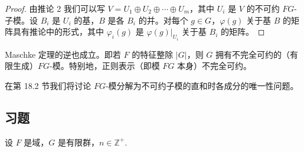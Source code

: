 \begin{proof}
由推论 2 我们可以写 \(V = U_1 \oplus U_2 \oplus \cdots \oplus U_m\)，其中 \(U_i\) 是 \(V\) 的不可约 \(FG\)-子模。设 \(B_i\) 是 \(U_i\) 的基，\(B\) 是各 \(B_i\) 的并。对每个 \(g \in G\)，\(\varphi(g)\) 关于基 \(B\) 的矩阵具有推论中的形式，其中 \(\varphi_i(g)\) 是 \(\varphi(g)|_{U_i}\) 关于基 \(B_i\) 的矩阵。
\end{proof}

Maschke 定理的逆也成立。即若 \(F\) 的特征整除 \(|G|\)，则 \(G\) 拥有不完全可约的（有限生成）\(FG\)-模。特别地，正则表示（即模 \(FG\) 本身）不完全可约。

在第 18.2 节我们将讨论 \(FG\)-模分解为不可约子模的直和时各成分的唯一性问题。

\subsection*{习题}

设 \(F\) 是域，\(G\) 是有限群，\(n \in \mathbb{Z}^+\).

